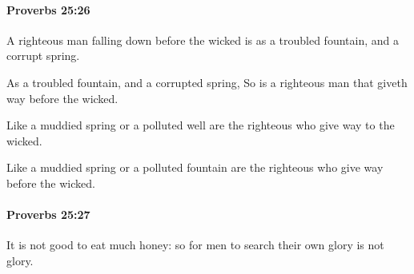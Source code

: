 		\paragraph{Proverbs 25:26} %
			\label{PROVERBS-25-26}

			A righteous man falling down before the wicked is as a troubled fountain, and a corrupt spring.

			\begin{versebox}
					\item[BHS] 
					\item[ASV] As a troubled fountain, and a corrupted spring, So is a righteous man that giveth way before the wicked.
					\item[NIV] Like a muddied spring or a polluted well are the righteous who give way to the wicked.
					\item[NRSV] Like a muddied spring or a polluted fountain are the righteous who give way before the wicked.
			\end{versebox}

		\paragraph{Proverbs 25:27} %
			\label{PROVERBS-25-27}

			It is not good to eat much honey: so for men to search their own glory is not glory.

